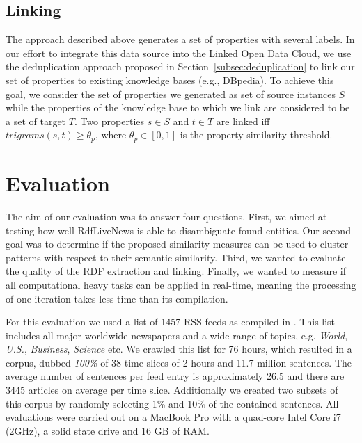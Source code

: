 \documentclass[a4paper]{llncs}
\newcommand{\NAME}{RdfLiveNews}
\begin{document}

\subsection{Linking}
\label{subsec:mapping_to_dbpedia}
The approach described above generates a set of properties with several labels. 
In our effort to integrate this data source into the Linked Open Data Cloud, we use the deduplication approach proposed in Section~\ref{subsec:deduplication} to link our set of properties to existing knowledge bases (e.g., DBpedia).
To achieve this goal, we consider the set of properties we generated as set of source instances $S$ while the properties of the knowledge base to which we link are considered to be a set of target $T$.
Two properties $s \in S$ and $t \in T$ are linked iff $trigrams(s, t) \geq \theta_p$, where $\theta_p \in [0, 1]$ is the property similarity threshold.
 
\section{Evaluation}
\label{sec:evaluation}
The aim of our evaluation was to answer four questions.
First, we aimed at testing how well \NAME{} is able to disambiguate found entities. 
Our second goal was to determine if the proposed similarity measures can be used to cluster patterns with respect to their semantic similarity.
Third, we wanted to evaluate the quality of the RDF extraction and linking.
Finally, we wanted to measure if all computational heavy tasks can be applied in real-time, meaning the processing of one iteration takes less time than its compilation.

For this evaluation we used a list of 1457 RSS feeds as compiled in \cite{GOLDHAHN12.327}.
This list includes all major worldwide newspapers and a wide range of topics, e.g. \emph{World}, \emph{U.S.}, \emph{Business}, \emph{Science} etc.
We crawled this list for 76 hours, which resulted in a corpus, dubbed \emph{100\%} of 38 time slices of 2 hours and 11.7 million sentences.
The average number of sentences per feed entry is approximately 26.5 and there are 3445 articles on average per time slice.
Additionally we created two subsets of this corpus by randomly selecting 1\% and 10\% of the contained sentences.
All evaluations were carried out on a MacBook Pro with a quad-core Intel Core i7 (2GHz), a solid state drive and 16 GB of RAM.
\end{document}
